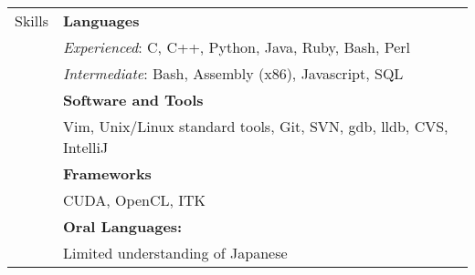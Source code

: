 \documentclass[11pt]{article}
\begin{document}
\begin{tabular}{p{1.0in} p{5.16in}}
    {Skills} &
        \textbf{Languages} \\ &
        \qquad \textit{Experienced}: C, C++, Python, Java, Ruby, Bash, Perl \\ &
        \qquad \textit{Intermediate}: Bash, Assembly (x86), Javascript, SQL \\ & \vspace{0.015in}
        \textbf{Software and Tools} \\ &
        \qquad Vim, Unix/Linux standard tools, Git, SVN, gdb, lldb, CVS, IntelliJ \\ & \vspace{0.015in}
        \textbf{Frameworks} \\ &
        \qquad CUDA, OpenCL, ITK \\ & \vspace{0.015in}
        \textbf{Oral Languages:} \\ &
        \qquad Limited understanding of Japanese \\
\end{tabular}
\end{document}

